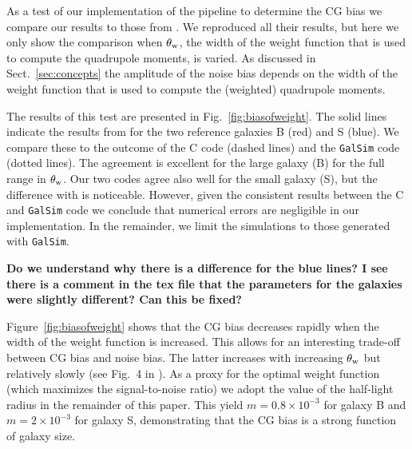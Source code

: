 \documentclass[useAMS,usenatbib]{mnras}
\begin{document}
As a test of our implementation of the pipeline to determine the CG bias we compare our results to those from . We reproduced all their results, but here we only show the comparison when 
$\theta_{\rm w}$, the width of the weight function that is used to compute the quadrupole moments, is varied. As discussed in Sect.~\ref{sec:concepts} the amplitude of the noise bias depends on the width of the weight function that is used to compute the (weighted) quadrupole moments. 

The results of this test are presented in Fig.~\ref{fig:biasofweight}. The solid lines indicate the results from  for the two reference galaxies B (red) and S (blue). We compare these to the outcome of the C code (dashed lines) and the {\tt GalSim} code (dotted lines). The agreement is excellent for the large galaxy (B) for the full range in $\theta_{\rm w}$. Our two codes agree also well for the small galaxy (S), but the difference with  is noticeable. However, given the consistent results between the C and {\tt GalSim} code we conclude that numerical errors are negligible in our implementation. In the remainder, we limit the simulations to those generated with {\tt GalSim}.

{\bf Do we understand why there is a difference for the blue lines? I see there is a comment in the 
tex file that the parameters for the galaxies were slightly different? Can this be fixed?}

Figure~\ref{fig:biasofweight} shows that the CG bias decreases rapidly when the width of the weight function is increased. This allows for an interesting trade-off between CG bias and noise bias. The latter increases with increasing $\theta_{\rm w}$ but relatively slowly (see Fig.~4 in ). As a proxy for the optimal weight function (which maximizes the signal-to-noise ratio) we adopt the value of the 
half-light radius in the remainder of this paper. This yield $m=0.8\times10^{-3}$ for galaxy B and
$m=2\times10^{-3}$ for galaxy S, demonstrating that the CG bias is a strong function of galaxy size.
\end{document}
